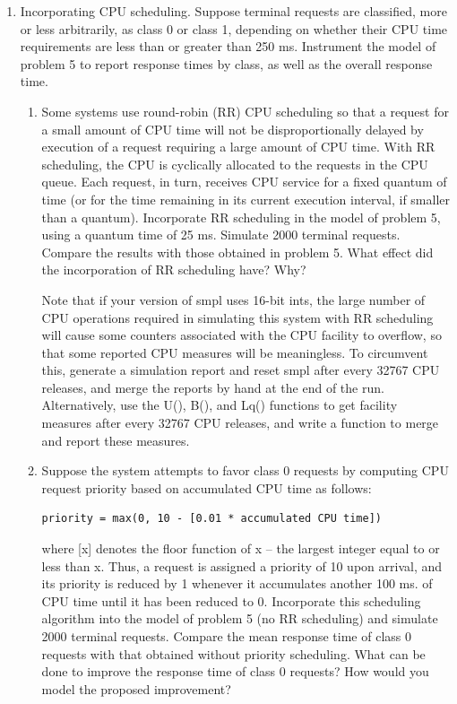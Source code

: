 \begin{enumerate}
Make a simulation run of 2000 terminal requests. Compute the response time
components as before (keep in mind that swap queue delays and disk transfers
for swapouts do not contribute to the response time except when a program
swapin has to wait on its own swapout).

\item Incorporating CPU scheduling. Suppose terminal requests are classified,
more or less arbitrarily, as class 0 or class 1, depending on whether their CPU
time requirements are less than or greater than 250 ms. Instrument the model
of problem 5 to report response times by class, as well as the overall response
time.

\begin{enumerate}
\item Some systems use round-robin (RR) CPU scheduling so that a request for a
small amount of CPU time will not be disproportionally delayed by execution of
a request requiring a large amount of CPU time. With RR scheduling, the CPU is
cyclically allocated to the requests in the CPU queue. Each request, in turn,
receives CPU service for a fixed quantum of time (or for the time remaining in
its current execution interval, if smaller than a quantum). Incorporate RR
scheduling in the model of problem 5, using a quantum time of 25 ms. Simulate
2000 terminal requests. Compare the results with those obtained in problem 5.
What effect did the incorporation of RR scheduling have? Why?

Note that if your version of smpl uses 16-bit ints, the large number of CPU
operations required in simulating this system with RR scheduling will cause
some counters associated with the CPU facility to overflow, so that some
reported CPU measures will be meaningless. To circumvent this, generate a
simulation report and reset smpl after every 32767 CPU releases, and merge the
reports by hand at the end of the run. Alternatively, use the U(), B(), and
Lq() functions to get facility measures after every 32767 CPU releases, and
write a function to merge and report these measures.

\item Suppose the system attempts to favor class 0 requests by computing CPU
request priority based on accumulated CPU time as follows:

\begin{verbatim}
priority = max(0, 10 - [0.01 * accumulated CPU time])
\end{verbatim}

where [x] denotes the floor function of x -- the largest integer equal to or
less than x. Thus, a request is assigned a priority of 10 upon arrival, and its
priority is reduced by 1 whenever it accumulates another 100 ms. of CPU time
until it has been reduced to 0. Incorporate this scheduling algorithm into the
model of problem 5 (no RR scheduling) and simulate 2000 terminal requests.
Compare the mean response time of class 0 requests with that obtained without
priority scheduling. What can be done to improve the response time of class 0
requests? How would you model the proposed improvement?
\end{enumerate}
\end{enumerate}
